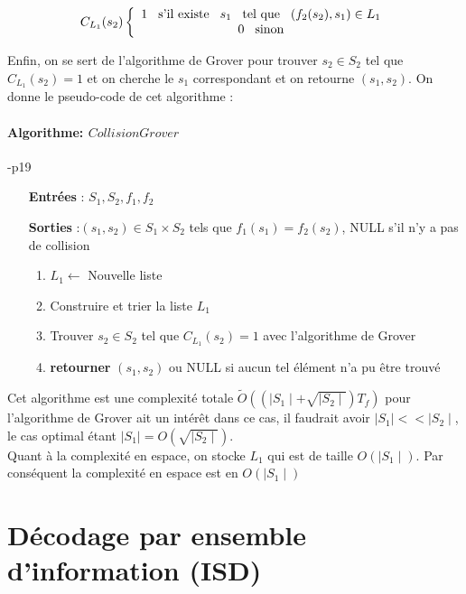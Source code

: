\documentclass[12pt,openany]{report}
\begin{document}
\[ C_{L_1}(s_2)
\left \{
\begin{array}{c c}
   1 \hspace{0.3cm} \text{s'il existe}\hspace{0.3cm} s_1\hspace{0.3cm} \text{tel que} \hspace{0.3cm} (f_2(s_2),s_1)\in L_1\\
   0 \hspace{0.3cm} \text{sinon}
\end{array}
\right.
\]

Enfin, on se sert de l’algorithme de Grover pour trouver $s_2 \in S_2$ tel que
$C_{L_1}
(s_2) = 1 $ et on cherche le $s_1$ correspondant et on retourne $(s_1, s_2)$.
On donne le pseudo-code de cet algorithme :
\paragraph{Algorithme: $CollisionGrover $}\cite{Ghazal}-p19\\

\begin{itemize}
\item[\textbf{Entrées}]: $S_1,S_2,f_1,f_2 $
\item[\textbf{Sorties}]:$ (s_1,s_2)\in S_1 \times S_2  $ tels que $f_1(s_1)=f_2(s_2) $, NULL s'il n'y a pas de collision
\begin{enumerate}
\item $ L_1 \gets  $ Nouvelle liste
\item Construire et trier la liste $ L_1 $
\item Trouver $ s_2 \in S_2 $ tel que $C_{L_1}(s_2)=1  $ avec l'algorithme de Grover
\item \textbf{retourner} $ (s_1,s_2)  $ ou NULL si aucun tel élément n'a pu être trouvé
\end{enumerate}

\end{itemize}
Cet algorithme est une complexité totale $\tilde{O}\left(\left(\mid S_1\mid + \sqrt{\mid S_2\mid} \right)T_f  \right)   $ pour l'algorithme de Grover ait un intérêt dans ce cas, il faudrait avoir $\mid S_1 \mid <<\mid S_2 \mid  $, le cas optimal étant $\mid S_1 \mid =O(\sqrt{\mid S_2 \mid})   $.\\
Quant à la complexité en espace, on stocke $L_1$ qui est de taille $O(\mid S_1 \mid)$. Par
conséquent la complexité en espace est en $O(\mid S_1\mid )$



\section{Décodage par ensemble d’information (ISD)}
\end{document}
